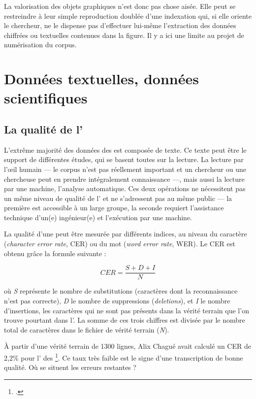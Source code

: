 La valorisation des objets graphiques n'est donc pas chose aisée. Elle peut se restreindre à leur simple reproduction doublée d'une indexation qui, si elle oriente le chercheur, ne le dispense pas d'effectuer lui-même l'extraction des données chiffrées ou textuelles contenues dans la figure. Il y a ici une limite au projet de numérisation du corpus.

\newpage
\thispagestyle{empty}
\mbox{}
\newpage

\chapter{Données textuelles, données scientifiques}

\section{La qualité de l'\ocr}

L'extrême majorité des données des \odm{} est composée de texte. Ce texte peut être le support de différentes études, qui se basent toutes sur la lecture. La lecture par l'\oe{}il humain --- le corpus n'est pas réellement important et un chercheur ou une chercheuse peut en prendre intégralement connaissance ---, mais aussi la lecture par une machine, \cad{} l'analyse automatique. Ces deux opérations ne nécessitent pas un même niveau de qualité de l'\ocr{} et ne s'adressent pas au même public --- la première est accessible à un large groupe, la seconde requiert l'assistance technique d'un(e) ingénieur(e) et l'exécution par une machine.

La qualité d'une \ocr{} peut être mesurée par différents indices, au niveau du caractère (\textit{character error rate}, CER) ou du mot (\textit{word error rate}, WER).  Le CER est obtenu grâce la formule suivante :

\[CER = \frac{S + D + I}{N}\]

où \textit{S} représente le nombre de substitutions (caractères dont la reconnaissance n'est pas correcte), \textit{D} le nombre de suppressions (\textit{deletions}), et \textit{I} le nombre d'insertions, \cad{} les caractères qui ne sont pas présents dans la vérité terrain que l'on trouve pourtant dans l'\ocr. La somme de ces trois chiffres est divisée par le nombre total de caractères dans le fichier de vérité terrain (\textit{N}).

À partir d'une vérité terrain de 1300 lignes, Alix Chagué avait calculé un CER de 2,2\% pour l'\ocr{} des \odm\footcite[slide 16]{inria-pp}. Ce taux très faible est le signe d'une transcription de bonne qualité. Où se situent les erreurs restantes ?

